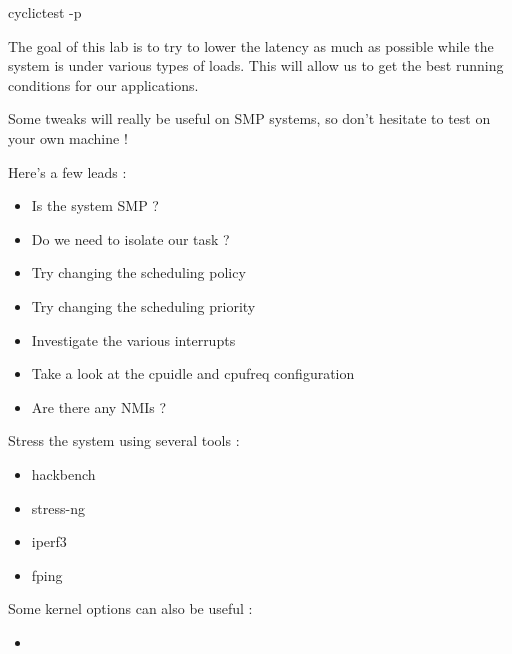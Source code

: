 \begin{bashinput}
cyclictest -p 
\end{bashinput}

The goal of this lab is to try to lower the latency as much as possible while
the system is under various types of loads. This will allow us to get the
best running conditions for our applications.

Some tweaks will really be useful on SMP systems, so don't hesitate to test on
your own machine !

Here's a few leads :

\begin{itemize}
	\item Is the system SMP ?
	\item Do we need to isolate our task ?
	\item Try changing the scheduling policy
	\item Try changing the scheduling priority
	\item Investigate the various interrupts
	\item Take a look at the cpuidle and cpufreq configuration
	\item Are there any NMIs ?
\end{itemize}

Stress the system using several tools :

\begin{itemize}
	\item hackbench
	\item stress-ng
	\item iperf3
	\item fping
\end{itemize}

Some kernel options can also be useful :

\begin{itemize}
	\item {}
\end{itemize}
